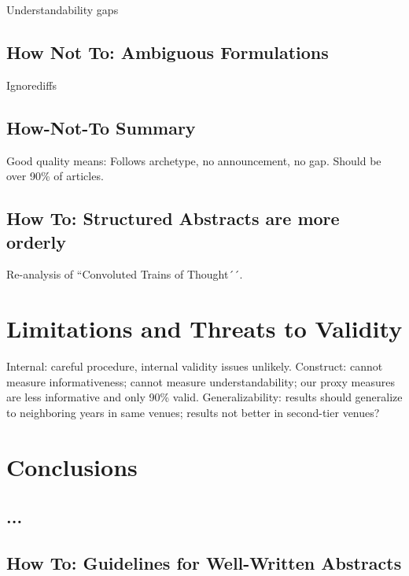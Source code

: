 \documentclass[10pt,journal,compsoc]{IEEEtran}
\begin{document}
\noindent
Understandability gaps


\subsection{How Not To: Ambiguous Formulations}

\noindent
Ignorediffs


\subsection{How-Not-To Summary}

\noindent
Good quality means: Follows archetype, no announcement, no gap.
Should be over 90\% of articles.


\subsection{How To: Structured Abstracts are more orderly}

\noindent
Re-analysis of ``Convoluted Trains of Thought´´. 




\section{Limitations and Threats to Validity}

\noindent
Internal: careful procedure, internal validity issues unlikely.
Construct: cannot measure informativeness; cannot measure understandability;
our proxy measures are less informative and only 90\% valid.
Generalizability: 
results should generalize to neighboring years in same venues;
results not better in second-tier venues?


\section{Conclusions}


\subsection{...}
\noindent


\subsection{How To: Guidelines for Well-Written Abstracts}
\end{document}

